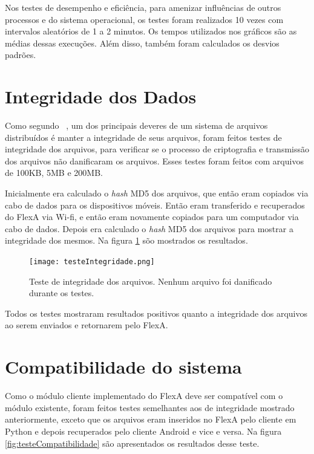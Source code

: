      Nos testes de desempenho e eficiência, para amenizar influências de outros processos e do sistema operacional, os testes foram realizados 10 vezes com intervalos aleatórios de 1 a 2 minutos. Os tempos utilizados nos gráficos são as médias dessas execuções. Além disso, também foram calculados os desvios padrões.

\section{Integridade dos Dados}

Como segundo ~\cite{coulouris}, um dos principais deveres de um sistema de arquivos distribuídos é manter a integridade de seus arquivos, foram feitos testes de integridade dos arquivos, para verificar se o processo de criptografia e transmissão dos arquivos não danificaram os arquivos. Esses testes foram feitos com arquivos de 100KB, 5MB e 200MB.
    
    Inicialmente era calculado o \textit{hash} MD5 dos arquivos, que então eram copiados via cabo de dados para os dispositivos móveis. Então eram transferido e recuperados do FlexA via Wi-fi, e então eram novamente copiados para um computador via cabo de dados. Depois era calculado o \textit{hash} MD5 dos arquivos para mostrar a integridade dos mesmos. Na figura \ref{fig:testesIntegridade} sõo mostrados os resultados.

    \begin{figure}[!ht]
    \centering
    \texttt{[image: testeIntegridade.png]}
    \caption{Teste de integridade dos arquivos. Nenhum arquivo foi danificado durante os testes.}
    \label{fig:testesIntegridade}
    \end{figure}

    Todos os testes mostraram resultados positivos quanto a integridade dos arquivos ao serem enviados e retornarem pelo FlexA.
    
\section{Compatibilidade do sistema}

    Como o módulo cliente implementado do FlexA deve ser compatível com o módulo existente, foram feitos testes semelhantes aos de integridade mostrado anteriormente, exceto que os arquivos eram inseridos no FlexA pelo cliente em Python e depois recuperados pelo cliente Android e vice e versa. Na figura \ref{fig:testeCompatibilidade} são apresentados os resultados desse teste.
    
